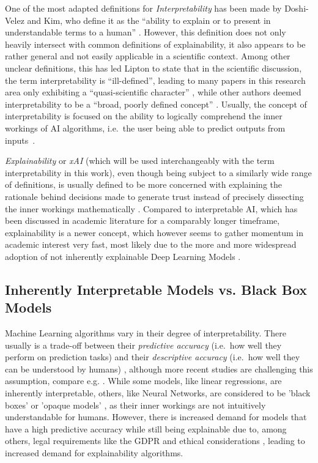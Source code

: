 One of the most adapted definitions for \textit{Interpretability} has been made by Doshi-Velez and Kim, who define it as the “ability to explain or to present in understandable terms to a human” \parencite{DoshiVelez2017}. 
However, this definition does not only heavily intersect with common definitions of explainability, it also appears to be rather general and not easily applicable in a scientific context. 
Among other unclear definitions, this has led Lipton to state that in the scientific discussion, the term interpretability is “ill-defined”, leading to many papers in this research area only exhibiting a “quasi-scientific character” \parencite{Lipton2018}, while other authors deemed interpretability to be a “broad, poorly defined concept” \parencite{Murdoch2019}. 
Usually, the concept of interpretability is focused on the ability to logically comprehend the inner workings of AI algorithms, i.e.\ the user being able to predict outputs from inputs~\parencite{Kim2016}.

\textit{Explainability} or \textit{xAI} (which will be used interchangeably with the term interpretability in this work), even though being subject to a similarly wide range of definitions, is usually defined to be more concerned with explaining the rationale behind decisions made to generate trust instead of precisely dissecting the inner workings mathematically \parencite{Gunning2019}. 
Compared to interpretable AI, which has been discussed in academic literature for a comparably longer timeframe, explainability is a newer concept, which however seems to gather momentum in academic interest very fast, most likely due to the more and more widespread adoption of not inherently explainable Deep Learning Models \parencite{BarredoArrieta2020}.


\subsection{Inherently Interpretable Models vs. Black Box Models}\label{subsec:inherently}

Machine Learning algorithms vary in their degree of interpretability. There usually is a trade-off between their \textit{predictive accuracy} (i.e.\ how well they perform on prediction tasks) and their \textit{descriptive accuracy} (i.e.\ how well they can be understood by humans) \parencite{Murdoch2019}, although more recent studies are challenging this assumption, compare e.g. \cite{Cooper2024}.
While some models, like linear regressions, are inherently interpretable, others, like Neural Networks, are considered to be 'black boxes' \parencite{Guidotti2018} or 'opaque models' \parencite{Burrell2016}, as their inner workings are not intuitively understandable for humans.
However, there is increased demand for models that have a high predictive accuracy while still being explainable due to, among others, legal requirements like the GDPR \parencite{GDPR} and ethical considerations \parencite{Guidotti2018}, leading to increased demand for explainability algorithms.

